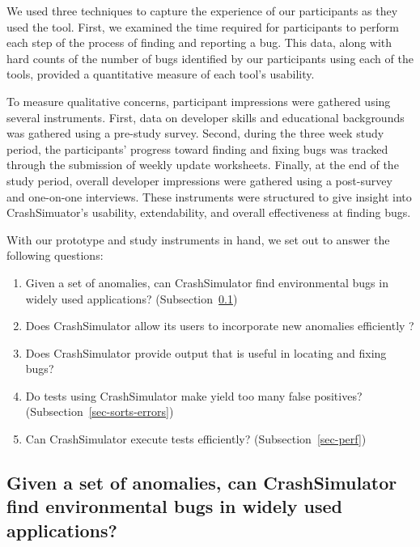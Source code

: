 We used three techniques to capture the experience of our participants as
they used the tool.  First, we examined the time required for participants
to perform each step of the process of finding and reporting a bug.
This data, along with hard counts of the number of bugs identified by our
participants using each of the tools, provided a quantitative measure of
each tool's usability.

To measure qualitative concerns,
participant impressions were gathered using
several instruments.  First, data on developer skills and educational
backgrounds was gathered using a pre-study survey.
Second, during the three week
study period, the participants' progress toward finding and fixing bugs was
tracked through the submission of weekly update worksheets.  Finally, at
the end of the study period, overall developer impressions were gathered
using a post-survey and one-on-one interviews.  These instruments were
structured to give insight into CrashSimuator's usability, extendability, and
overall effectiveness at finding bugs.

With our prototype and study instruments in hand, we
set out to answer the following questions:

\begin{enumerate}

\item{Given a set of anomalies,
      can CrashSimulator find environmental bugs in widely used
      applications?
(Subsection~\ref{sec-env-bugs})}

\item{Does CrashSimulator allow its users to incorporate new anomalies
      efficiently ?}

\item Does CrashSimulator provide output that is useful in locating and
fixing bugs?

\item{Do tests using CrashSimulator make yield too many false positives?
      (Subsection~\ref{sec-sorts-errors})}

\item{Can CrashSimulator
      execute tests efficiently? (Subsection~\ref{sec-perf})}

\end{enumerate}

\subsection{Given a set of anomalies, can CrashSimulator find
environmental bugs in widely used applications?}
\label{sec-env-bugs}

